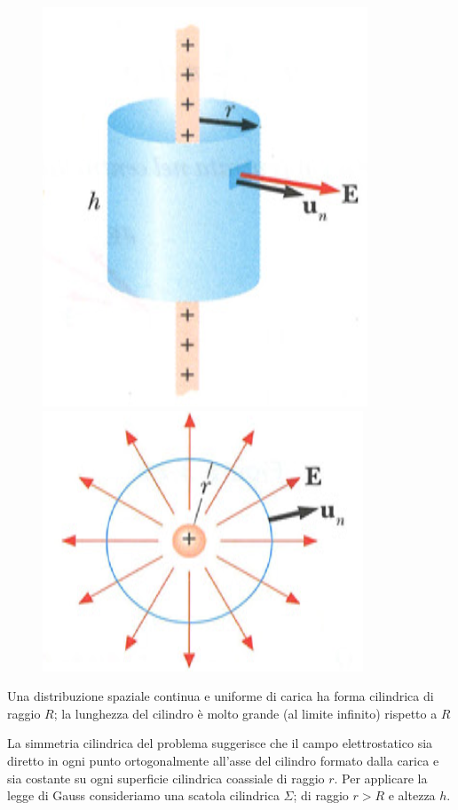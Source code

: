 \documentclass[class=book, crop=false, oneside, 12pt]{standalone}
\begin{document}
\begin{figure}[h]
    \includegraphics[scale=0.4]{campo_cilindro.png}
    \includegraphics[scale=0.4]{campo_cilindro_sezione.png}
    \centering
    \caption{}
\end{figure}
Una distribuzione spaziale continua e uniforme di carica ha forma cilindrica di raggio \(R\); la lunghezza del cilindro è molto grande (al limite infinito) rispetto a \(R\) 

La simmetria cilindrica del problema suggerisce che il campo elettrostatico sia diretto in ogni punto ortogonalmente all'asse del cilindro formato dalla carica e sia costante su ogni superficie cilindrica coassiale di raggio \(r\).
Per applicare la legge di Gauss consideriamo una scatola cilindrica \(\Sigma\); di raggio \(r > R\) e altezza \(h\).
\end{document}
